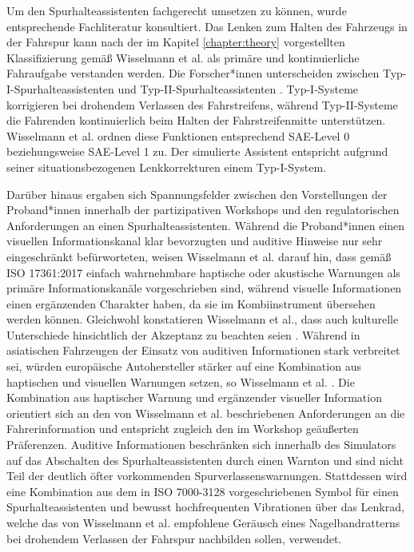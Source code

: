 Um den Spurhalteassistenten fachgerecht umsetzen zu können, wurde entsprechende Fachliteratur \cite{wisselmann2024querfuehrungsassistenz} konsultiert. Das Lenken zum Halten des Fahrzeugs in der Fahrspur kann nach der im Kapitel \ref{chapter:theory} vorgestellten Klassifizierung \cite{Geisler_hci2021} gemäß Wisselmann et al. \cite{wisselmann2024querfuehrungsassistenz} als primäre und kontinuierliche Fahraufgabe verstanden werden. Die Forscher*innen unterscheiden zwischen Typ-I-Spurhalteassistenten und Typ-II-Spurhalteassistenten \cite{wisselmann2024querfuehrungsassistenz}. Typ-I-Systeme korrigieren bei drohendem Verlassen des Fahrstreifens, während Typ-II-Systeme die Fahrenden kontinuierlich beim Halten der Fahrstreifenmitte unterstützen. Wisselmann et al. \cite{wisselmann2024querfuehrungsassistenz} ordnen diese Funktionen entsprechend SAE-Level 0 beziehungsweise SAE-Level 1 \cite{SAE2021J3016} zu. Der simulierte Assistent entspricht aufgrund seiner situationsbezogenen Lenkkorrekturen einem Typ-I-System.

Darüber hinaus ergaben sich Spannungsfelder zwischen den Vorstellungen der Proband*innen innerhalb der partizipativen Workshops und den regulatorischen Anforderungen an einen Spurhalteassistenten. Während die Proband*innen einen visuellen Informationskanal klar bevorzugten und auditive Hinweise nur sehr eingeschränkt befürworteten, weisen Wisselmann et al. \cite{wisselmann2024querfuehrungsassistenz} darauf hin, dass gemäß ISO 17361:2017 \cite{ISO17361_2017} einfach wahrnehmbare haptische oder akustische Warnungen als primäre Informationskanäle vorgeschrieben sind, während visuelle Informationen einen ergänzenden Charakter haben, da sie im Kombiinstrument übersehen werden können. Gleichwohl konstatieren Wisselmann et al., dass auch kulturelle Unterschiede hinsichtlich der Akzeptanz zu beachten seien \cite{wisselmann2024querfuehrungsassistenz}. Während in asiatischen Fahrzeugen der Einsatz von auditiven Informationen stark verbreitet sei, würden europäische Autohersteller stärker auf eine Kombination aus haptischen und visuellen Warnungen setzen, so Wisselmann et al. \cite{wisselmann2024querfuehrungsassistenz}. Die Kombination aus haptischer Warnung und ergänzender visueller Information orientiert sich an den von Wisselmann et al. \cite{wisselmann2024querfuehrungsassistenz} beschriebenen Anforderungen an die Fahrerinformation und entspricht zugleich den im Workshop geäußerten Präferenzen. Auditive Informationen beschränken sich innerhalb des Simulators auf das Abschalten des Spurhalteassistenten durch einen Warnton und sind nicht Teil der deutlich öfter vorkommenden Spurverlassenswarnungen. Stattdessen wird eine Kombination aus dem in ISO 7000-3128 \cite{ISO7000_3128} vorgeschriebenen Symbol für einen Spurhalteassistenten und bewusst hochfrequenten Vibrationen über das Lenkrad, welche das von Wisselmann et al. \cite{wisselmann2024querfuehrungsassistenz} empfohlene Geräusch eines Nagelbandratterns bei drohendem Verlassen der Fahrspur nachbilden sollen, verwendet. 

